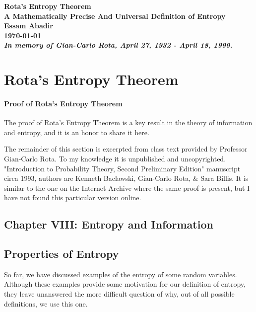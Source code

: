 \documentclass{report}
\begin{document}
\begin{titlepage}
    \centering
    \vspace*{\fill}
    \Huge\bfseries Rota's Entropy Theorem\\
    \Large A Mathematically Precise And Universal Definition of Entropy\\
    \vspace{1cm}
    \Large Essam Abadir\\
    \vspace{1cm}
    \large \today\\

    \vspace{3cm}
    \normalfont \emph{In memory of Gian-Carlo Rota, April 27, 1932 - April 18, 1999.}
    \vspace*{\fill}
\end{titlepage}

\section*{Rota's Entropy Theorem}

\paragraph{Proof of Rota's Entropy Theorem}
The proof of Rota's Entropy Theorem is a key result in the theory of information and entropy, and it is an honor to share it here.

The remainder of this section is excerpted from class text provided by Professor Gian-Carlo Rota. To my knowledge it is unpublished and uncopyrighted. "Introduction to Probability Theory, Second Preliminary Edition" manuscript circa 1993, authors are Kenneth Baclawski, Gian-Carlo Rota, \& Sara Billis. It is similar to the one on the Internet Archive\cite{RotaBaclawski} where the same proof is present, but I have not found this particular version online. 
\medskip
\medskip

\subsection*{Chapter VIII: Entropy and Information}
\normalsize
\subsection*{Properties of Entropy}

So far, we have discussed examples of the entropy of some random variables. Although these examples provide some motivation for our definition of entropy, they leave unanswered the more difficult question of why, out of all possible definitions, we use this one.
\end{document}
